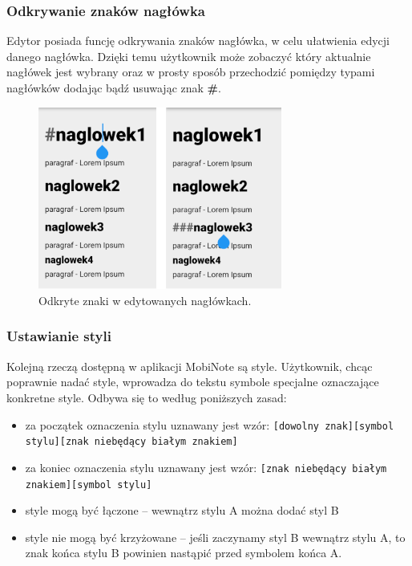 \documentclass[shortabstract]{iithesis}
\begin{document}
\subsubsection{Odkrywanie znaków nagłówka}

Edytor posiada funcję odkrywania znaków nagłówka, w celu ułatwienia edycji danego nagłówka. Dzięki temu użytkownik może zobaczyć który aktualnie nagłówek jest wybrany oraz w prosty sposób przechodzić pomiędzy typami nagłówków dodając bądź usuwając znak \textbf{\#}.


\begin{figure}[ht]
    \centering
    \includegraphics[height=6cm]{images/pokazywanie_naglowkow.png}
    \caption{Odkryte znaki w edytowanych nagłówkach.}
\end{figure}

\subsubsection{Ustawianie styli}

Kolejną rzeczą dostępną w aplikacji MobiNote są style. Użytkownik, chcąc poprawnie nadać style, wprowadza do tekstu symbole specjalne oznaczające konkretne style.
Odbywa się to według poniższych zasad:

\begin{itemize}
    \setlength\itemsep{2mm}

    \item za początek oznaczenia stylu uznawany jest wzór: \newline
    \verb|[dowolny znak][symbol stylu][znak niebędący białym znakiem]|
    
    \item za koniec oznaczenia stylu uznawany jest wzór: \newline
    \verb|[znak niebędący białym znakiem][symbol stylu]|
    
    \item style mogą być łączone -- wewnątrz stylu A można dodać styl B

    \item style nie mogą być krzyżowane -- jeśli zaczynamy styl B wewnątrz stylu A, to znak końca stylu B powinien nastąpić przed symbolem końca A. 
\end{itemize}
\end{document}
